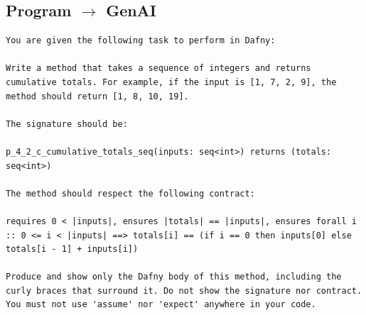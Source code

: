 \documentclass{article}
\begin{document}
\subsection*{Program $\rightarrow$ GenAI}
\begin{lstlisting}
You are given the following task to perform in Dafny:

Write a method that takes a sequence of integers and returns cumulative totals. For example, if the input is [1, 7, 2, 9], the method should return [1, 8, 10, 19].

The signature should be:

p_4_2_c_cumulative_totals_seq(inputs: seq<int>) returns (totals: seq<int>)

The method should respect the following contract:

requires 0 < |inputs|, ensures |totals| == |inputs|, ensures forall i :: 0 <= i < |inputs| ==> totals[i] == (if i == 0 then inputs[0] else totals[i - 1] + inputs[i])

Produce and show only the Dafny body of this method, including the curly braces that surround it. Do not show the signature nor contract. You must not use 'assume' nor 'expect' anywhere in your code.
\end{lstlisting}
\end{document}
